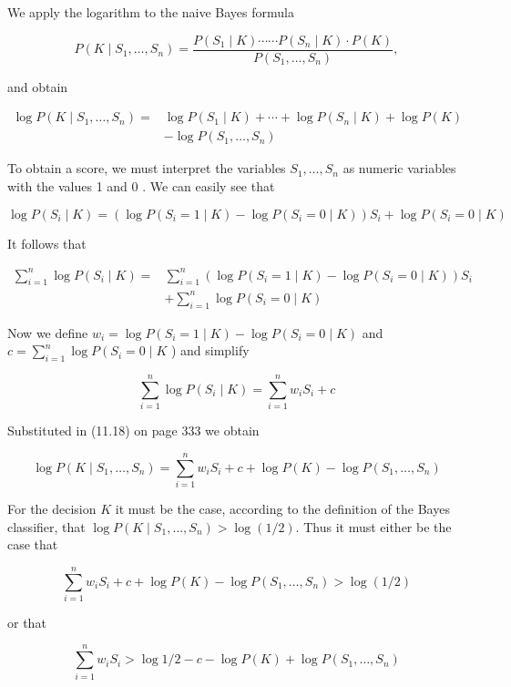 \documentclass[10pt]{book}
\begin{document}
We apply the logarithm to the naive Bayes formula

$$
P\left(K \mid S_{1}, \ldots, S_{n}\right)=\frac{P\left(S_{1} \mid K\right) \cdots \cdots P\left(S_{n} \mid K\right) \cdot P(K)}{P\left(S_{1}, \ldots, S_{n}\right)},
$$

and obtain


\begin{align*}
\log P\left(K \mid S_{1}, \ldots, S_{n}\right)= & \log P\left(S_{1} \mid K\right)+\cdots+\log P\left(S_{n} \mid K\right)+\log P(K) \\
& -\log P\left(S_{1}, \ldots, S_{n}\right) \tag{11.18}
\end{align*}


To obtain a score, we must interpret the variables $S_{1}, \ldots, S_{n}$ as numeric variables with the values 1 and 0 . We can easily see that

$$
\log P\left(S_{i} \mid K\right)=\left(\log P\left(S_{i}=1 \mid K\right)-\log P\left(S_{i}=0 \mid K\right)\right) S_{i}+\log P\left(S_{i}=0 \mid K\right)
$$

It follows that

$$
\begin{aligned}
\sum_{i=1}^{n} \log P\left(S_{i} \mid K\right)= & \sum_{i=1}^{n}\left(\log P\left(S_{i}=1 \mid K\right)-\log P\left(S_{i}=0 \mid K\right)\right) S_{i} \\
& +\sum_{i=1}^{n} \log P\left(S_{i}=0 \mid K\right)
\end{aligned}
$$

Now we define $w_{i}=\log P\left(S_{i}=1 \mid K\right)-\log P\left(S_{i}=0 \mid K\right)$ and $c=\sum_{i=1}^{n} \log P\left(S_{i}=\right. 0 \mid K$ ) and simplify

$$
\sum_{i=1}^{n} \log P\left(S_{i} \mid K\right)=\sum_{i=1}^{n} w_{i} S_{i}+c
$$

Substituted in (11.18) on page 333 we obtain

$$
\log P\left(K \mid S_{1}, \ldots, S_{n}\right)=\sum_{i=1}^{n} w_{i} S_{i}+c+\log P(K)-\log P\left(S_{1}, \ldots, S_{n}\right)
$$

For the decision $K$ it must be the case, according to the definition of the Bayes classifier, that $\log P\left(K \mid S_{1}, \ldots, S_{n}\right)>\log (1 / 2)$. Thus it must either be the case that

$$
\sum_{i=1}^{n} w_{i} S_{i}+c+\log P(K)-\log P\left(S_{1}, \ldots, S_{n}\right)>\log (1 / 2)
$$

or that

$$
\sum_{i=1}^{n} w_{i} S_{i}>\log 1 / 2-c-\log P(K)+\log P\left(S_{1}, \ldots, S_{n}\right)
$$
\end{document}

